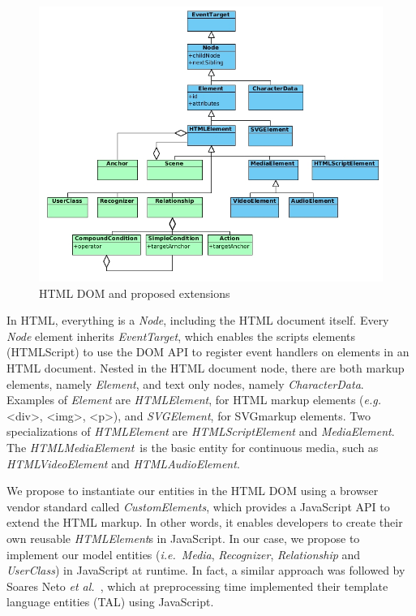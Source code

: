 \begin{figure}[h]
  \begin{center}
    \includegraphics[width=12cm, keepaspectratio]{img/img12.png}
    \captionvspace
    \caption{HTML DOM and proposed extensions}
    \label{fig:htmldom}
    \captionvspace
  \end{center}
\end{figure}

In HTML, everything is a \textit{Node}, including the HTML document itself.
Every \textit{Node} element inherits \textit{EventTarget}, which enables the
scripts elements (HTMLScript) to use the DOM API to register event handlers on
elements in an HTML document. Nested in the HTML document node, there are both
markup elements, namely \textit{Element}, and text only nodes, namely
\textit{CharacterData}. Examples of \textit{Element} are \textit{HTMLElement},
for HTML markup
elements (\textit{e.g.} <div>, <img>, <p>), and
\textit{SVGElement}, for SVG\footnotemark markup elements. Two specializations
of \textit{HTMLElement} are \textit{HTMLScriptElement} and
\textit{MediaElement}. The \textit{HTMLMediaElement}\footnotemark~is the basic
entity for continuous media, such as \textit{HTMLVideoElement} and
\textit{HTMLAudioElement}.


We propose to instantiate our entities in the HTML DOM using a browser vendor
standard called \textit{CustomElements}\footnotemark, which provides a
JavaScript API to extend the HTML markup. In other words, it enables developers
to create their own reusable \textit{HTMLElement}s in JavaScript. In our case,
we propose to implement our model entities (\textit{i.e.}~\textit{Media},
\textit{Recognizer}, \textit{Relationship} and \textit{UserClass}) in
JavaScript at runtime. In fact, a similar approach was followed by Soares Neto
\textit{et al.}~\cite{neto_tal_2012}, which at preprocessing time implemented
their template language entities (TAL) using JavaScript.

